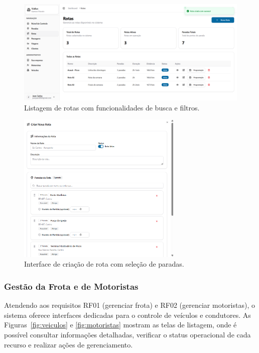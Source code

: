 \begin{figure}[H]
  \centering
  \includegraphics[width=1\textwidth]{imagens/tela-rotas.png}
  \caption{Listagem de rotas com funcionalidades de busca e filtros.}
  \label{fig:tela-rotas}
\end{figure}

\begin{figure}[H]
  \centering
  \includegraphics[width=0.7\textwidth]{imagens/criacao-rota.png}
  \caption{Interface de criação de rota com seleção de paradas.}
  \label{fig:criacao-rota}
\end{figure}

\subsubsection{Gestão da Frota e de Motoristas}
Atendendo aos requisitos RF01 (gerenciar frota) e RF02 (gerenciar motoristas), o sistema oferece interfaces dedicadas para o controle de veículos e condutores. As Figuras~\ref{fig:veiculos} e \ref{fig:motoristas} mostram as telas de listagem, onde é possível consultar informações detalhadas, verificar o status operacional de cada recurso e realizar ações de gerenciamento.

